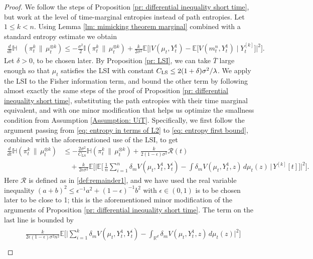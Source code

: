 \documentclass[11pt,reqno]{amsart}
\numberwithin{equation}{section}
\theoremstyle{definition}
\def\E{{\mathbb E}}
\def\R{{\mathbb R}}
\newcommand{\ent}{ \mathbb H}
\newcommand{\fin}{\mathbb I}
\begin{document}
\begin{proof}
    We follow the steps of Proposition \ref{pr: differential inequality short time}, but work at the level of time-marginal entropies instead of path entropies. Let $1 \le k < n$. Using Lemma \ref{lm: mimicking theorem marginal} combined with a standard entropy estimate \cite[Lemma 3.1]{SharpChaosLacker2023} we obtain 
    \begin{align*}
        \frac{d}{dt}\ent&(\pi^k_t\,\|\,\mu^{\otimes k}_t)\leq-\frac{\sigma^2}{2}\fin (\pi_t^k\,\|\,\mu_t^{\otimes k})+  \frac{k}{2\sigma^2}\E\bigg[\Big | V(\mu_t,Y_t^1)-\E\Big[ V(m_t^n,Y_t^1)\mid Y_t^{[k]}\Big]\Big |^2\bigg].
    \end{align*}
     Let $\delta > 0$, to be chosen later.
     By Proposition \ref{pr: LSI}, we can take $\overline{T}$ large enough so that $\mu_t$ satisfies the LSI with constant $C_{\textup{LS}}\le 2(1+\delta)\sigma^2/\lambda$. 
     We apply the LSI to the Fisher information term, and bound the other term by following almost exactly the same steps of the proof of Proposition \ref{pr: differential inequality short time}, substituting the path entropies with their time marginal equivalent, and with one minor modification that helps us optimize the smallness condition from Assumption \ref{Assumption: UiT}. Specifically, we first follow the argument passing from  \eqref{eq: entropy in terms of L2} to \eqref{eq: entropy first bound}, combined with the aforementioned use of the LSI, to get
     \begin{align*}
         \frac{d}{dt}\ent(\pi^k_t\,\|\,\mu^{\otimes k}_t) &\le -\frac{2\sigma^2}{C_{\text{LS}}}\ent (\pi_t^k\,\|\,\mu_t^{\otimes k}) + \frac{k}{2(1-\epsilon)\sigma^2}\mathcal R(t) \\
         &\quad + \frac{k}{2\epsilon\sigma^2}\E\bigg[\Big|\E\Big[\,\frac{1}{n}\sum_{i=1}^n \delta_m  V(\mu_t,Y_t^1,Y_t^i)-\int \delta_m  V(\mu_t,Y_t^1,z)\,d\mu_t(z)\,\Big\vert\,Y^{[k]}[t]\Big]\Big|^2\bigg].
     \end{align*}
     Here $\mathcal R$ is defined as in  \eqref{def:remainder1}, and we have used the real variable inequality $(a+b)^2 \le \epsilon^{-1}a^2+(1-\epsilon)^{-1}b^2$ with $\epsilon \in (0,1)$ is to be chosen later to be close to 1; this is the aforementioned minor modification of the arguments of Proposition \ref{pr: differential inequality short time}. The term on the last line is bounded by
     \begin{align}
\label{eq: k^3 equation uit}
\begin{split}
&\frac{k}{2\epsilon(1-\epsilon)\sigma^2 n^2}\E\bigg[\Big |\sum_{i=1}^k  \delta_m V(\mu_t,Y_t^1,Y_t^{i})-\int_{\R^d}\delta_m V(\mu_t,Y_t^1,z)\,d\mu_t(z) \Big |^2\bigg]\\

\end{split}
\end{align}
\end{proof}
\end{document}
